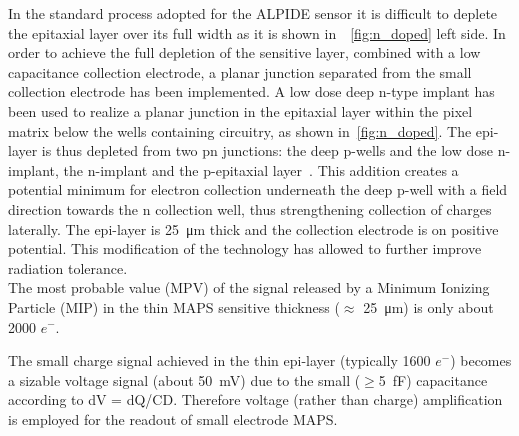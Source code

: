 In the standard process adopted for the ALPIDE sensor \cite{AGLIERIRINELLA2017583} it is difficult to deplete the epitaxial layer over its full width as it is shown in~~\autoref{fig:n_doped} left side. 
In order to achieve the full depletion of the sensitive layer, combined with a low capacitance collection electrode, a planar junction separated from the small collection electrode has been implemented.  A low dose deep n-type implant has been used to realize a planar junction in the epitaxial layer within the pixel matrix below the wells containing circuitry, as shown in~\autoref{fig:n_doped}. 
The epi-layer is thus depleted from two pn junctions: the deep p-wells and the low dose n-implant, the n-implant and the p-epitaxial layer~\cite{SNOEYS201790}. This addition creates a potential minimum for electron collection underneath the deep p-well with a field direction towards the n collection well, thus strengthening collection of charges laterally\cite{wermes_book2020}. The epi-layer is \SI{25}{\micro m} thick and the collection electrode is on positive potential.
This modification of the technology has allowed to further improve radiation tolerance. \\

The most probable value (MPV) of the signal released by a Minimum Ionizing Particle (MIP) in the thin MAPS sensitive thickness ($\approx$ \SI{25}{\micro m}) is only about 2000 $e^{-}$. 

The small charge signal achieved in the thin epi-layer (typically 1600 $e^{-}$) becomes a sizable voltage signal (about \SI{50}{mV}) due to the small ($\geq$\SI{5}{fF}) capacitance according to dV = dQ/CD. Therefore voltage (rather than charge) amplification is employed for the readout of small electrode MAPS.


\begin{comment}
However a additional modification of the technology have allowed to further improve radiation tolerance. In~\autoref{fig:n_doped} is displayed an example.\\

\begin{figure}[h!]
\centering
\texttt{[image: n\_doped]}
\caption{Small electrode design with the addition of a low n-doped layer.}
\label{fig:n_doped}
\end{figure}

The epi-layer is depleted from two pn junctions: the deep p-wells and the low dose n-implant, the n-implant and the p-epitaxial layer[CITE ARTICOLO 2]. This addition creates a potential minimum for electron collection underneath the deep p-well with a field direction towards the n collection well, thus strengthening collection of charges laterally[CITE]. The epi-layer is 25 $\mu$m thick and the collection electrode is on positive potential. [ESEMPIO DI SEGNALE CON CAPACITAE CARICA RILASCIATA.]
\end{comment}

